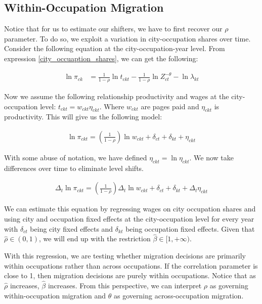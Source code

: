 \documentclass[10pt]{article}
\begin{document}

\subsection{Within-Occupation Migration}

Notice that for us to estimate our shifters, we have to first recover our $\rho$ parameter. To do so, we exploit a variation in city-occupation shares over time. Consider the following equation at the city-occupation-year level. From expression \ref{city_occuaption_shares}, we can get the following:

\begin{align*}
    \ln \pi_{ck} & = \frac{1}{1 - \rho} \ln t_{ckt} - \frac{1}{1 - \rho} \ln Z_{ct}^{- \theta} - \ln \lambda_{kt}
\end{align*}

Now we assume the following relationship productivity and wages at the city-occupation level: $t_{ckt} = w_{ckt} \eta_{ckt}$. Where $w_{ckt}$ are pages paid and $\eta_{ckt}$ is productivity. This will give us the following model:

\begin{align*}
    \ln \pi_{ckt} = \left( \frac{1}{1 - \rho} \right) \ln w_{ckt} + \delta_{ct} + \delta_{kt} + \eta_{ckt}
\end{align*}

With some abuse of notation, we have defined $\eta_{ckt} = \ln \eta_{ckt}$. We now take differences over time to eliminate level shifts.

\begin{align*}
    \Delta_t \ln \pi_{ckt} = \left( \frac{1}{1 - \rho} \right) \Delta_t \ln w_{ckt} + \delta_{ct} + \delta_{kt} + \Delta_t \eta_{ckt}
\end{align*}

We can estimate this equation by regressing wages on city occupation shares and using city and occupation fixed effects at the city-occupation level for every year with $\delta_{ct}$ being city fixed effects and $\delta_{kt}$ being occupation fixed effects. Given that $\hat{\rho} \in (0, 1)$, we will end up with the restriction $\hat{\beta} \in [1, +\infty)$.

With this regression, we are testing whether migration decisions are primarily within occupations rather than across occupations. If the correlation parameter is close to 1, then migration decisions are purely within occupations. Notice that as $\hat{\rho}$ increases, $\hat{\beta}$ increases. From this perspective, we can interpret $\rho$ as governing within-occupation migration and $\theta$ as governing across-occupation migration.
\end{document}
